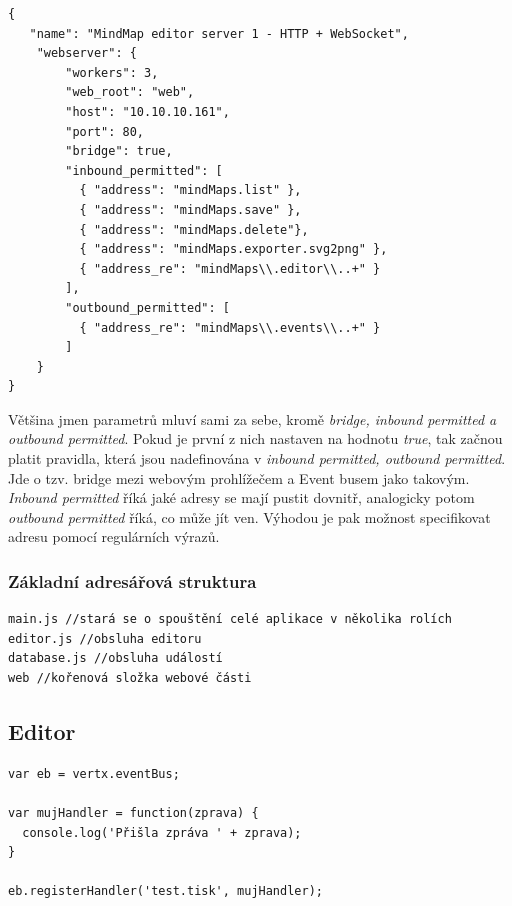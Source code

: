 \begin{lstlisting}[caption=Konfigurace serveru 1]
{
   "name": "MindMap editor server 1 - HTTP + WebSocket",
    "webserver": {
        "workers": 3,
        "web_root": "web",
        "host": "10.10.10.161",
        "port": 80,
        "bridge": true,
        "inbound_permitted": [
          { "address": "mindMaps.list" },
          { "address": "mindMaps.save" },
          { "address": "mindMaps.delete"},
          { "address": "mindMaps.exporter.svg2png" },
          { "address_re": "mindMaps\\.editor\\..+" }
        ],
        "outbound_permitted": [
          { "address_re": "mindMaps\\.events\\..+" }
        ]
    }
}
\end{lstlisting}

Většina jmen parametrů mluví sami za sebe, kromě \emph{bridge, inbound permitted a outbound permitted}. Pokud je první z nich nastaven na hodnotu \emph{true}, tak začnou platit pravidla, která jsou nadefinována v \emph{inbound permitted, outbound permitted}. Jde o tzv. bridge mezi webovým prohlížečem a Event busem jako takovým. \emph{Inbound permitted} říká jaké adresy se mají pustit dovnitř, analogicky potom \emph{outbound permitted} říká, co může jít ven. Výhodou je pak možnost specifikovat adresu pomocí regulárních výrazů.

\subsubsection{Základní adresářová struktura}

\begin{lstlisting}
main.js //stará se o spouštění celé aplikace v několika rolích
editor.js //obsluha editoru
database.js //obsluha událostí 
web //kořenová složka webové části
\end{lstlisting}

\subsection{Editor}

\begin{lstlisting}[caption=Zaregistrování obslužné rutiny v jazyce JavaScript]
var eb = vertx.eventBus;

var mujHandler = function(zprava) {
  console.log('Přišla zpráva ' + zprava);
}

eb.registerHandler('test.tisk', mujHandler);
\end{lstlisting}

